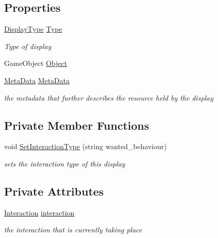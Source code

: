 \subsection*{Properties}
\begin{DoxyCompactItemize}
\item 
\mbox{\hyperlink{class_display_a7f7abc559192ef7e8f4a03382d3492d7}{Display\+Type}} \mbox{\hyperlink{class_display_a2c80ba13fff1fd81aaa6915b28e8c14f}{Type}}
\begin{DoxyCompactList}\small\item\em Type of display \end{DoxyCompactList}\item 
Game\+Object \mbox{\hyperlink{class_display_a32b9644a140d330a9c51cfdbb6f6093c}{Object}}
\item 
\mbox{\hyperlink{class_meta_data}{Meta\+Data}} \mbox{\hyperlink{class_display_a9ae693bcb1553822aed7ae887a65591c}{Meta\+Data}}
\begin{DoxyCompactList}\small\item\em the metadata that further describes the resource held by the display \end{DoxyCompactList}\end{DoxyCompactItemize}
\subsection*{Private Member Functions}
\begin{DoxyCompactItemize}
\item 
void \mbox{\hyperlink{class_display_af8aa8a663725645f431095397ad802e6}{Set\+Interaction\+Type}} (string wanted\+\_\+behaviour)
\begin{DoxyCompactList}\small\item\em sets the interaction type of this display \end{DoxyCompactList}\end{DoxyCompactItemize}
\subsection*{Private Attributes}
\begin{DoxyCompactItemize}
\item 
\mbox{\hyperlink{class_interaction}{Interaction}} \mbox{\hyperlink{class_display_af35594f083ed6dd4279183215719583f}{interaction}}
\begin{DoxyCompactList}\small\item\em the interaction that is currently taking place \end{DoxyCompactList}\end{DoxyCompactItemize}


